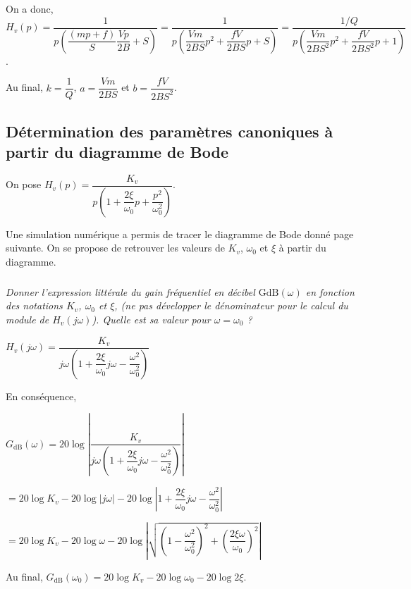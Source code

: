 \documentclass[10pt,fleqn]{article} %
\begin{document}
\begin{multicols}{2}
\begin{corrige}
On a donc, 
$H_v(p)
=\dfrac{1}{p\left(\dfrac{\left(mp+f\right)}{S} \dfrac{Vp}{2B}+S \right)}
=\dfrac{1}{p\left(\dfrac{Vm}{2BS}p^2+ \dfrac{fV}{2BS}p+S \right)}
=\dfrac{1/Q}{p\left(\dfrac{Vm}{2BS^2}p^2+ \dfrac{fV}{2BS^2}p+1 \right)}
$.

Au final, $k=\dfrac{1}{Q}$, $a=\dfrac{Vm}{2BS}$ et $b=\dfrac{fV}{2BS^2}$.
\end{corrige}

\subsection*{Détermination des paramètres canoniques à partir du diagramme de Bode}

On pose $H_v(p)=\dfrac{K_v}{p\left( 1+\dfrac{2\xi}{\omega_0} p + \dfrac{p^2}{\omega_0^2} \right)}$. 

Une simulation numérique a permis de tracer le diagramme de Bode donné page suivante. On se propose de retrouver les valeurs de $K_v$, $\omega_0$ et $\xi$ à partir du diagramme.


\subparagraph{}\textit{Donner l’expression littérale du gain fréquentiel en décibel $\text{GdB}(\omega)$ en fonction des notations $K_v$, $\omega_0$ et $\xi$, (ne pas développer le dénominateur pour le calcul du module de $H_v(j\omega)$). Quelle est sa valeur pour $\omega=\omega_0$ ?}

\begin{corrige}
$H_v(j\omega )=\dfrac{K_v}{j\omega\left( 1+\dfrac{2\xi}{\omega_0} j\omega - \dfrac{\omega^2}{\omega_0^2} \right)}$

En conséquence, 

$
G_{\text{dB}}\left(\omega \right)=20\log\left| \dfrac{K_v}{j\omega\left( 1+\dfrac{2\xi}{\omega_0} j\omega - \dfrac{\omega^2}{\omega_0^2} \right)} \right|
$

$
=20\log K_v- 20\log  \left| j\omega\right| - 20\log  \left| 1+\dfrac{2\xi}{\omega_0} j\omega - \dfrac{\omega^2}{\omega_0^2}  \right|
$

$
=20\log K_v- 20\log  \omega - 20\log  \left| \sqrt{\left(1- \dfrac{\omega^2}{\omega_0^2} \right)^2+\left( \dfrac{2\xi\omega }{\omega_0} \right)^2} \right|
$

Au final, 
$G_{\text{dB}}\left(\omega_0 \right)=
20\log K_v- 20\log  \omega_0 - 20\log 2\xi $.
\end{corrige}


\end{multicols}
\end{document}
